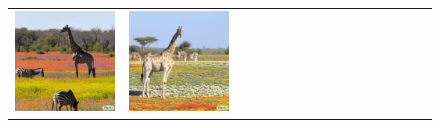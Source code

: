 \begin{figure}
\begin{adjustwidth}{-0.8in}{-0.5in}
\begin{tabular}{cccccccccccccccccccc}
\multicolumn{3}{c}{\includegraphics[width=\twobytwocolwidth\textwidth]{figures/limitations/giraffe_zebra3.jpg}} &
\multicolumn{3}{c}{\includegraphics[width=\twobytwocolwidth\textwidth]{figures/limitations/giraffe_zebra4.jpg}} &&

\end{tabular}
\end{adjustwidth}
\end{figure}
